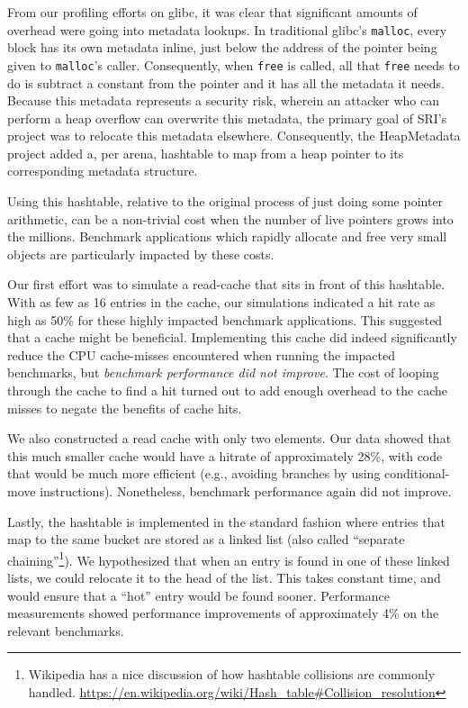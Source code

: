 
From our profiling efforts on glibc, it was clear that
significant amounts of overhead were going into metadata lookups.
In traditional glibc's \texttt{malloc}, every block has its own
metadata inline, just below the address of the pointer being given to
\texttt{malloc}'s caller. Consequently, when \texttt{free} is called,
all that \texttt{free} needs to do is subtract a constant from the
pointer and it has all the metadata it needs. Because this metadata
represents a security risk, wherein an attacker who can perform a heap
overflow can overwrite this metadata, the primary goal of SRI's
project was to relocate this metadata elsewhere. Consequently, the
HeapMetadata project added a, per arena, hashtable to map from a heap pointer to
its corresponding metadata structure.

Using this hashtable, relative to the original process of just doing
some pointer arithmetic, can be a non-trivial cost when the number of
live pointers grows into the millions. Benchmark applications which
rapidly allocate and free very small objects are particularly impacted
by these costs.

Our first effort was to simulate a read-cache that sits in front of
this hashtable. With as few as 16 entries in the cache, our
simulations indicated a hit rate as high as 50\% for these highly
impacted benchmark applications. This suggested that a cache might be
beneficial. Implementing this cache did indeed significantly reduce
the CPU cache-misses encountered when running the impacted benchmarks,
but {\em benchmark performance did not improve}. The cost of looping
through the cache to find a hit turned out to add enough overhead to
the cache misses to negate the benefits of cache hits.

We also constructed a read cache with only two elements. Our data
showed that this much smaller cache would have a hitrate of
approximately 28\%, with code that would be much more efficient (e.g.,
avoiding branches by using conditional-move
instructions). Nonetheless, benchmark performance again did not
improve.

Lastly, the hashtable is implemented in the standard fashion where
entries that map to the same bucket are stored as a linked list (also
called ``separate chaining''\footnote{Wikipedia has a nice discussion
  of how hashtable collisions are commonly
  handled. \url{https://en.wikipedia.org/wiki/Hash_table\#Collision_resolution}}). We
hypothesized that when an entry is found in one of these linked lists,
we could relocate it to the head of the list. This takes constant
time, and would ensure that a ``hot'' entry would be found
sooner. Performance measurements showed performance improvements of
approximately 4\% on the relevant benchmarks.
